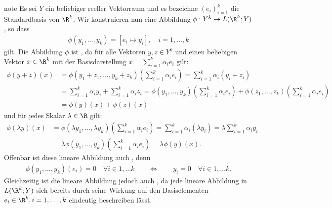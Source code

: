 \documentclass[letterpaper,10pt,german]{jupyterBook}
\begin{document}
\begin{sphinxadmonition}{note}
\sphinxAtStartPar
Es sei \(Y\) ein beliebiger reeller Vektorraum und es bezeichne \((e_i)_{i=1}^k\) die Standardbasis von \(\R^k\).
Wir konstruieren nun eine Abbildung \(\phi:Y^k\rightarrow L(\R^k; Y)\), so dass
\begin{equation*}
\begin{split}\phi(y_1,\ldots,y_k) = [e_i \mapsto y_i], \quad i = 1,\ldots,k\end{split}
\end{equation*}
\sphinxAtStartPar
gilt.
Die Abbildung \(\phi\) ist , da für alle Vektoren \(y,z \in Y^k\) und einen beliebigen Vektor \(x \in \R^k\) mit der Basisdarstellung \(x=\sum_{i=1}^k \alpha_i e_i\) gilt:
\begin{equation*}
\begin{split}\phi(y+z)(x) &= \phi(y_1+z_1,\ldots, y_k+z_k)(\sum_{i=1}^k \alpha_i e_i) = \sum_{i=1}^k \alpha_i (y_i + z_i) \\
&= \sum_{i=1}^k \alpha_i y_i + \sum_{i=1}^k \alpha_i z_i = \phi(y_1,\ldots, y_k)(\sum_{i=1}^k \alpha_i e_i) + \phi(z_1,\ldots, z_k)(\sum_{i=1}^k \alpha_i e_i) \\
&= \phi(y)(x) + \phi(z)(x)\end{split}
\end{equation*}
\sphinxAtStartPar
und für jedes Skalar \(\lambda \in \R\) gilt:
\begin{equation*}
\begin{split}\phi(\lambda y)(x) &= \phi(\lambda y_1,\ldots, \lambda y_k)(\sum_{i=1}^k \alpha_i e_i)
= \sum_{i=1}^k \alpha_i (\lambda y_i) = \lambda \sum_{i=1}^k \alpha_i y_i \\
&= \lambda \phi( y_1,\ldots, y_k)(\sum_{i=1}^k \alpha_i e_i)
= \lambda \phi(y)(x).\end{split}
\end{equation*}
\sphinxAtStartPar
Offenbar ist diese lineare Abbildung auch , denn
\begin{equation*}
\begin{split}\phi(y_1,\ldots,y_k)(e_i) = 0\quad\forall i\in{1,\ldots k} 
\qquad \Leftrightarrow \qquad
y_i = 0\quad\forall i\in{1,\ldots k}.\end{split}
\end{equation*}
\sphinxAtStartPar
Gleichzeitig ist die lineare Abbildung jedoch auch , da jede lineare Abbildung in \(L(\R^k; Y)\) sich bereits durch seine Wirkung auf den Basiselementen \(e_i \in \R^k, i=1,\ldots,k\) eindeutig beschreiben lässt.


\end{sphinxadmonition}
\end{document}
